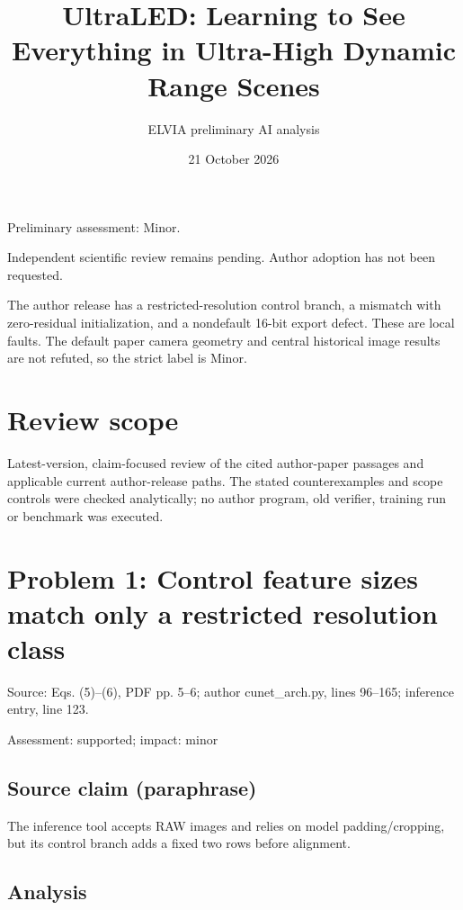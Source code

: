 \documentclass[11pt]{article}
\begin{document}
\title{UltraLED: Learning to See Everything in Ultra-High Dynamic Range Scenes}

\author{ELVIA preliminary AI analysis}\date{21 October 2026}\maketitle

Preliminary assessment: Minor.\par

Independent scientific review remains pending. Author adoption has not been requested.

The author release has a restricted-resolution control branch, a mismatch with zero-residual initialization, and a nondefault 16-bit export defect. These are local faults. The default paper camera geometry and central historical image results are not refuted, so the strict label is Minor.

\section*{Review scope}

Latest-version, claim-focused review of the cited author-paper passages and applicable current author-release paths. The stated counterexamples and scope controls were checked analytically; no author program, old verifier, training run or benchmark was executed.

\section*{Problem 1: Control feature sizes match only a restricted resolution class}

Source: Eqs. (5)–(6), PDF pp. 5–6; author cunet\_arch.py, lines 96–165; inference entry, line 123.

Assessment: supported; impact: minor

\subsection*{Source claim (paraphrase)}

The inference tool accepts RAW images and relies on model padding/cropping, but its control branch adds a fixed two rows before alignment.

\subsection*{Analysis}
\end{document}
